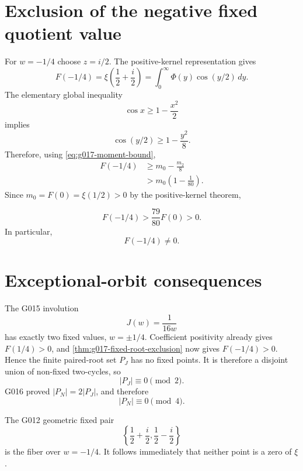 \section{Exclusion of the negative fixed quotient value}

For $w=-1/4$ choose $z=i/2$.  The positive-kernel representation gives
\begin{equation}
 F(-1/4)
 =\xi\!\left(\frac12+\frac{i}{2}\right)
 =\int_0^\infty\Phi(y)\cos(y/2)\,dy.
 \label{eq:g017-fixed-value-integral}
\end{equation}
The elementary global inequality
\[
 \cos x\ge1-\frac{x^2}{2}
\]
implies
\[
 \cos(y/2)\ge1-\frac{y^2}{8}.
\]
Therefore, using \cref{eq:g017-moment-bound},
\begin{align}
 F(-1/4)
 &\ge m_0-\frac{m_2}{8}\\
 &>m_0\left(1-\frac1{80}\right).
\end{align}
Since $m_0=F(0)=\xi(1/2)>0$ by the positive-kernel theorem,
\begin{theorem}
\label{thm:g017-fixed-root-exclusion}
\begin{equation}
 \boxed{
 F(-1/4)>\frac{79}{80}F(0)>0.
 }
 \label{eq:g017-main-lower-bound}
\end{equation}
In particular,
\[
 \boxed{F(-1/4)\ne0.}
\]
\end{theorem}

\section{Exceptional-orbit consequences}

The G015 involution
\[
 J(w)=\frac1{16w}
\]
has exactly two fixed values, $w=\pm1/4$.  Coefficient positivity already
gives $F(1/4)>0$, and \cref{thm:g017-fixed-root-exclusion} now gives
$F(-1/4)>0$.  Hence the finite paired-root set $P_J$ has no fixed points.
It is therefore a disjoint union of non-fixed two-cycles, so
\begin{equation}
 \boxed{|P_J|\equiv0\pmod2.}
 \label{eq:g017-PJ-even}
\end{equation}
G016 proved $|P_N|=2|P_J|$, and therefore
\begin{equation}
 \boxed{|P_N|\equiv0\pmod4.}
 \label{eq:g017-PN-mod4}
\end{equation}

The G012 geometric fixed pair
\[
 \left\{\frac12+\frac i2,\frac12-\frac i2\right\}
\]
is the fiber over $w=-1/4$.  It follows immediately that neither point is a
zero of $\xi$.

